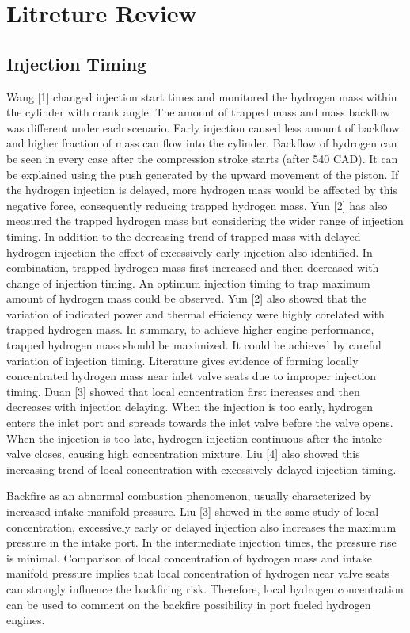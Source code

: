 \documentclass[conference]{IEEEtran}
\begin{document}
\section{Litreture Review}

\subsection{Injection Timing}

Wang [1] changed injection start times and monitored the hydrogen mass within the cylinder with crank angle. The amount of trapped mass and mass backflow was different under each scenario. Early injection caused less amount of backflow and higher fraction of mass can flow into the cylinder. Backflow of hydrogen can be seen in every case after the compression stroke starts (after 540 CAD). It can be explained using the push generated by the upward movement of the piston. If the hydrogen injection is delayed, more hydrogen mass would be affected by this negative force, consequently reducing trapped hydrogen mass. Yun [2] has also measured the trapped hydrogen mass but considering the wider range of injection timing. In addition to the decreasing trend of trapped mass with delayed hydrogen injection the effect of excessively early injection also identified. In combination, trapped hydrogen mass first increased and then decreased with change of injection timing. An optimum injection timing to trap maximum amount of hydrogen mass could be observed. Yun [2] also showed that the variation of indicated power and thermal efficiency were highly corelated with trapped hydrogen mass. In summary, to achieve higher engine performance, trapped hydrogen mass should be maximized. It could be achieved by careful variation of injection timing.
Literature gives evidence of forming locally concentrated hydrogen mass near inlet valve seats due to improper injection timing. Duan [3] showed that local concentration first increases and then decreases with injection delaying. When the injection is too early, hydrogen enters the inlet port and spreads towards the inlet valve before the valve opens. When the injection is too late, hydrogen injection continuous after the intake valve closes, causing high concentration mixture. Liu [4] also showed this increasing trend of local concentration with excessively delayed injection timing. 

Backfire as an abnormal combustion phenomenon, usually characterized by increased intake manifold pressure. Liu [3] showed in the same study of local concentration, excessively early or delayed injection also increases the maximum pressure in the intake port. In the intermediate injection times, the pressure rise is minimal. Comparison of local concentration of hydrogen mass and intake manifold pressure implies that local concentration of hydrogen near valve seats can strongly influence the backfiring risk. Therefore, local hydrogen concentration can be used to comment on the backfire possibility in port fueled hydrogen engines.
\end{document}
